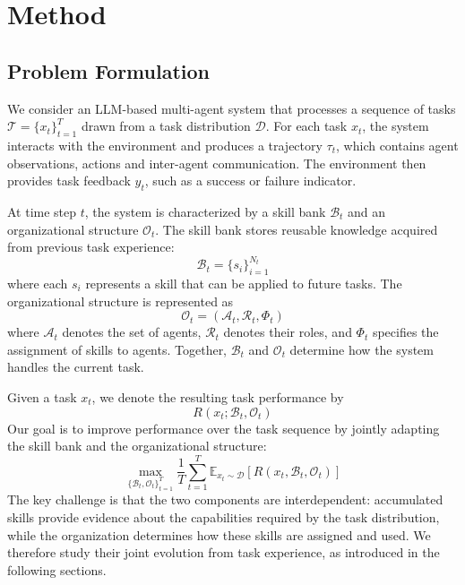 \section{Method}

\subsection{Problem Formulation}

We consider an LLM-based multi-agent system that processes a sequence of tasks $\mathcal{T}=\{x_t\}_{t=1}^{T}$ drawn from a task distribution $\mathcal{D}$. For each task $x_t$, the system interacts with the environment and produces a trajectory $\tau_t$, which contains agent observations, actions and inter-agent communication. The environment then provides task feedback $y_t$, such as a success or failure indicator.

At time step $t$, the system is characterized by a skill bank $\mathcal{B}_t$ and an organizational structure $\mathcal{O}_t$. The skill bank stores reusable knowledge acquired from previous task experience:
\begin{equation}
    \mathcal{B}_t = \{s_i\}_{i=1}^{N_t}
\end{equation}
where each $s_i$ represents a skill that can be applied to future tasks. The organizational structure is represented as
\begin{equation}
    \mathcal{O}_t = (\mathcal{A}_t, \mathcal{R}_t, \Phi_t)
\end{equation}
where $\mathcal{A}_t$ denotes the set of agents, $\mathcal{R}_t$ denotes their roles, and $\Phi_t$ specifies the assignment of skills to agents. Together, $\mathcal{B}_t$ and $\mathcal{O}_t$ determine how the system handles the current task.

Given a task $x_t$, we denote the resulting task performance by
\begin{equation}
    R(x_t; \mathcal{B}_t, \mathcal{O}_t)
\end{equation}
Our goal is to improve performance over the task sequence by jointly adapting the skill bank and the organizational structure:
\begin{equation}
    \max_{\{\mathcal{B}_t,\mathcal{O}_t\}_{t=1}^{T}}
    \frac{1}{T}\sum_{t=1}^{T}
    \mathbb{E}_{x_t \sim \mathcal{D}}
    \left[R(x_t,\mathcal{B}_t,\mathcal{O}_t)\right]
\end{equation}
The key challenge is that the two components are interdependent: accumulated skills provide evidence about the capabilities required by the task distribution, while the organization determines how these skills are assigned and used. We therefore study their joint evolution from task experience, as introduced in the following sections.


